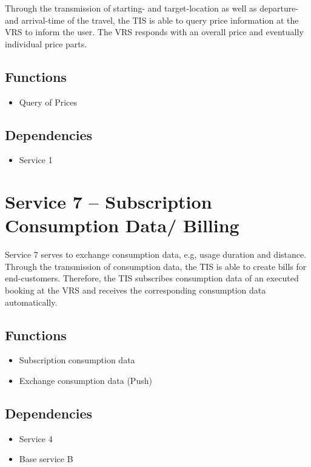 Through the transmission of starting- and target-location as well as departure- and arrival-time of the travel, the TIS is able to query price information at the VRS to inform the user. The VRS responds with an overall price and eventually individual price parts.

\subsection*{Functions}
\begin{itemize}
\item Query of Prices
\end{itemize}

\subsection*{Dependencies}
\begin{itemize}
\item Service 1
\end{itemize}


\section{Service 7 -- Subscription Consumption Data/ Billing}
Service 7 serves to exchange consumption data, e.g, usage duration and distance. Through the transmission of consumption data, the TIS is able to create bills for end-customers. Therefore, the TIS subscribes consumption data of an executed booking at the VRS and receives the corresponding consumption data automatically. 

\subsection*{Functions}
\begin{itemize}
\item Subscription consumption data 
\item Exchange consumption data (Push)
\end{itemize}

\subsection*{Dependencies}
\begin{itemize}
\item Service 4
\item Base service B
\end{itemize}

